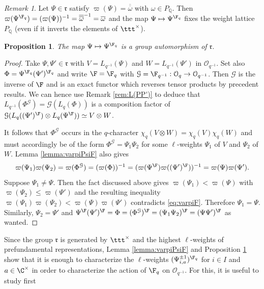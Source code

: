 \documentclass[11pt]{amsart}
\newtheorem{prop}[theorem]{Proposition}
\theoremstyle{definition}
\theoremstyle{remark}
\newtheorem{rem}[theorem]{Remark}
\numberwithin{equation}{section}
\begin{document}
\begin{rem} Let $\Psi \in \mathfrak{r}$ satisfy $\varpi(\Psi) = \overline{\overline{\omega}}$ with $\omega\in P_{\mathbb{Q}}$. Then $\varpi(\Psi^{\F_q})=(\varpi(\Psi))^{-1} = \overline{\overline{\omega}}^{-1} = \overline{\omega}$ and the map $\Psi \mapsto \Psi^{\F_q}$ fixes the weight lattice $P_{\mathbb{Q}}$ (even if it inverts the elements of $\ttt^{\times}$).
\end{rem}
\begin{prop}\label{prop:Fgroup} The map $\Psi\mapsto \Psi^{\F_q}$ is a group automorphism of $\mathfrak{r}$.
\end{prop}
\begin{proof}
Take $\Psi,\Psi'\in\mathfrak{r}$ with $V=L_{q^{-1}}(\Psi)$ and $W= L_{q^{-1}}(\Psi')$ in $\mathcal{O}_{q^{-1}}$. Set also $\Phi = \Psi^{\F_q}(\Psi')^{\F_q}$ and write $\F = \F_q$ with $\mathcal{G}=\F_{q^{-1}}:\mathcal{O}_q\rightarrow \mathcal{O}_{q^{-1}}$. Then $\mathcal{G}$ is the inverse of $\F$ and is an exact functor which reverses tensor products by precedent results. We can hence use Remark \ref{rem:L(PP')} to deduce that $L_{q^{-1}}(\Phi^{\mathcal{G}}) = \mathcal{G}(L_q(\Phi))$ is a composition factor of $\mathcal{G}(L_q((\Psi')^{\F})\otimes L_q(\Psi^{\F}))\simeq V\otimes W$.\par It follows that $\Phi^{\mathcal{G}}$ occurs in the $q$-character $\chi_q(V\otimes W)=\chi_q(V)\chi_q(W)$ and must accordingly be of the form $\Phi^{\mathcal{G}} = \Psi_1\Psi_2$ for some $\ell$-weights $\Psi_1$ of $V$ and $\Psi_2$ of $W$. Lemma \ref{lemma:varpiPsiF} also gives
\begin{equation}\label{eq:varpiF}
\varpi(\Psi_1)\varpi(\Psi_2)=\varpi(\Phi^{\mathcal{G}}) = (\varpi(\Phi))^{-1} = (\varpi(\Psi^{\F})\varpi((\Psi')^{\F}))^{-1} = \varpi(\Psi)\varpi(\Psi').
\end{equation}
Suppose $\Psi_1 \neq \Psi$. Then the fact discussed above gives $\varpi(\Psi_1)<\varpi(\Psi)$ with $\varpi(\Psi_2)\leq \varpi(\Psi')$ and the resulting inequality $\varpi(\Psi_1)\varpi(\Psi_2)< \varpi(\Psi)\varpi(\Psi')$ contradicts \eqref{eq:varpiF}. Therefore $\Psi_1 = \Psi$. Similarly, $\Psi_2 = \Psi'$ and $\Psi^{\F}(\Psi')^{\F}=\Phi = (\Phi^{\mathcal{G}})^{\F} = (\Psi_1\Psi_2)^{\F} = (\Psi\Psi')^{\F}$ as wanted.
\end{proof}
Since the group $\mathfrak{r}$ is generated by $\ttt^{\times}$ and the highest $\ell$-weights of prefundamental representations, Lemma \ref{lemma:varpiPsiF} and Proposition \ref{prop:Fgroup} show that it is enough to characterize the $\ell$-weights $(\Psi_{i,a}^{\pm 1})^{\F_q}$ for $i\in I$ and $a \in \C^{\times}$ in order to characterize the action of $\F_q$ on $\mathcal{O}_{q^{-1}}$. For this, it is useful to study first 
\end{document}

